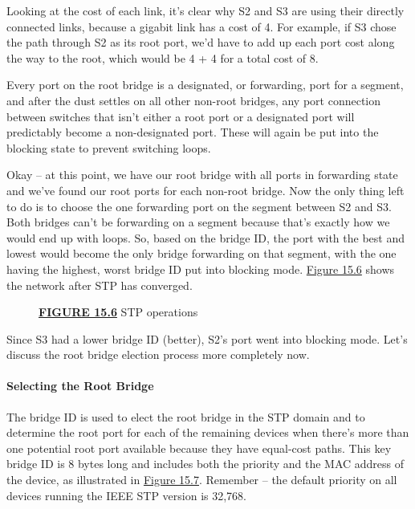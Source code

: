 Looking at the cost of each link, it's clear why S2 and S3 are using
their directly connected links, because a gigabit link has a cost of 4.
For example, if S3 chose the path through S2 as its root port, we'd have
to add up each port cost along the way to the root, which would be 4 + 4
for a total cost of 8.

Every port on the root bridge is a designated, or forwarding, port for a
segment, and after the dust settles on all other non-root bridges, any
port connection between switches that isn't either a root port or a
designated port will predictably become a non-designated port. These
will again be put into the blocking state to prevent switching loops.

Okay -- at this point, we have our root bridge with all ports in
forwarding state and we've found our root ports for each non-root
bridge. Now the only thing left to do is to choose the one forwarding
port on the segment between S2 and S3. Both bridges can't be forwarding
on a segment because that's exactly how we would end up with loops. So,
based on the bridge ID, the port with the best and lowest would become
the only bridge forwarding on that segment, with the one having the
highest, worst bridge ID put into blocking mode.
\protect\hyperlink{c15.xhtmlux5cux23figure15-6}{Figure 15.6} shows the
network after STP has converged.

\begin{figure}
\centering
\caption{{\protect\hyperlink{c15.xhtmlux5cux23figureanchor15-6}{\textbf{FIGURE
15.6}} STP operations}}
\end{figure}

Since S3 had a lower bridge ID (better), S2's port went into blocking
mode. Let's discuss the root bridge election process more completely
now.

\paragraph{Selecting the Root Bridge}

The bridge ID is used to elect the root bridge in the STP domain and to
determine the root port for each of the remaining devices when there's
more than one potential root port available because they have equal-cost
paths. This key bridge ID is 8 bytes long and includes both the priority
and the MAC address of the device, as illustrated in
\protect\hyperlink{c15.xhtmlux5cux23figure15-7}{Figure 15.7}.
Remember -- the default priority on all devices running the IEEE STP
version is 32,768.

